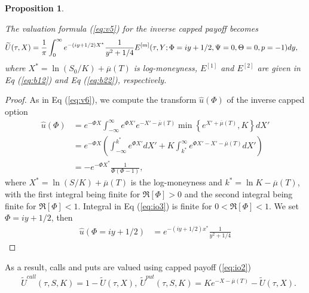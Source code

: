 \documentclass[11pt,a4paper] {article}
\newtheorem{proposition}{Proposition}[section]
\begin{document}
\begin{proposition} \label{invopt}

The valuation formula (\ref{eq:v5}) for the inverse capped payoff becomes
\begin{equation} \label{eq:io5}
\begin{split}
   \widetilde{U}(\tau, X)&  =  \frac{1}{\pi}  \int^{\infty}_{0} e^{-(iy+1/2) X^{*}}  \frac{1}{y^{2}+1/4} E^{[m]}(\tau,Y; \Phi=iy+1/2,\Psi=0, \Theta=0, p=-1)dy,\vspace*{-1.0\baselineskip}
\end{split}
\end{equation}
where $X^{*}=\ln(S_{0}/K)+\overline{\mu}(T)$ is log-moneyness, $E^{[1]}$ and $E^{[2]}$ are given in Eq (\ref{eq:b12}) and Eq (\ref{eq:b22}), respectively.

\end{proposition}


\begin{proof}
As in Eq (\ref{eq:v6}), we compute the transform $\widehat{u}(\Phi)$ of the inverse capped option
\begin{equation} \label{eq:io3}
\begin{split}
   \widehat{u}(\Phi) & =  e^{-\Phi X}\int^{\infty}_{-\infty}e^{\Phi X'} e^{-X'-\overline{\mu}(T)} \min\left\{e^{ X'+\overline{\mu}(T)},K\right\}  dX'  \\
	& = e^{-\Phi X} \left(\int^{k^{*}}_{-\infty}e^{\Phi X'}  dX' +K  \int^{\infty}_{k^{*}}e^{\Phi X'-X'-\overline{\mu}(T)}  dX'\right)\\
	& =  -e^{-\Phi X^{*}}\frac{1}{\Phi(\Phi-1)},
\end{split} 
\end{equation}
where $X^{*}=\ln(S/K)+\overline{\mu}(T)$ is the log-moneyness and $k^{*}=\ln K-\overline{\mu}(T)$, with the first integral being finite for $\Re[\Phi]>0$ and the second integral being finite for $\Re[\Phi]<1$. Integral in Eq (\ref{eq:io3}) is finite for $0<\Re[\Phi]<1$. We set $\Phi = iy+1/2$, then
\begin{equation} \label{eq:io4}
\begin{split}
   \widehat{u}(\Phi = iy+1/2) & =  e^{-(iy+1/2) x^{*}}  \frac{1}{y^{2}+1/4}
\end{split}
\end{equation}
\end{proof}




As a result, calls and puts are valued using capped payoff (\ref{eq:io2})
\begin{equation} \label{eq:io6}
\begin{split}
&\widetilde{U}^{call}(\tau, S,K) =1- \widetilde{U}(\tau, X), \ \widetilde{U}^{put}(\tau, S,K)=K e^{-X-\overline{\mu}(T)} - \widetilde{U}(\tau, X).
\end{split} 
\end{equation}
\end{document}
